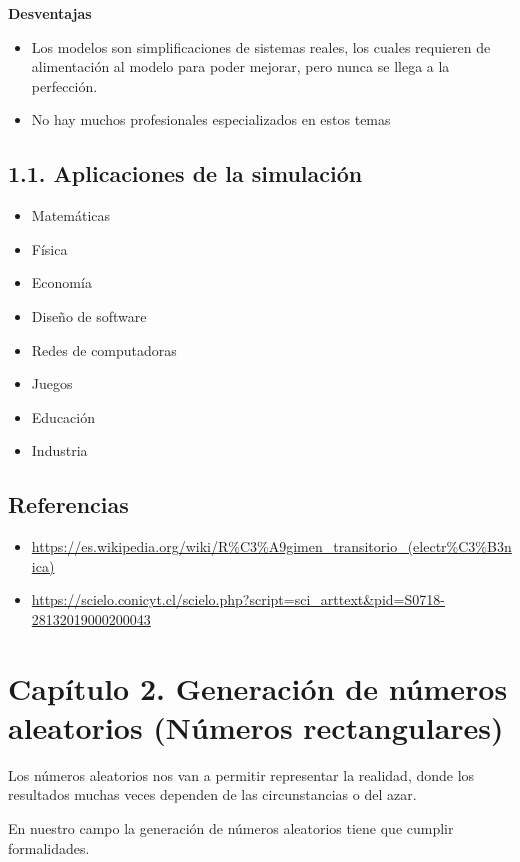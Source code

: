 \documentclass[11pt,letterpaper]{report}
\begin{document}
\textbf{Desventajas}
\begin{itemize}[label=-]
\item Los modelos son simplificaciones de sistemas reales, los cuales requieren de alimentación al modelo para poder mejorar, pero nunca se llega a la perfección.
\item No hay muchos profesionales especializados en estos temas
\end{itemize}

\subsection*{1.1. Aplicaciones de la simulación}

\begin{itemize}
\item Matemáticas
\item Física
\item Economía
\item Diseño de software
\item Redes de computadoras
\item Juegos
\item Educación
\item Industria
\end{itemize}

\subsection*{Referencias}

\begin{itemize}
\item \url{https://es.wikipedia.org/wiki/R%C3%A9gimen_transitorio_(electr%C3%B3nica)}
\item \url{https://scielo.conicyt.cl/scielo.php?script=sci_arttext&pid=S0718-28132019000200043}
\end{itemize}

\section*{Capítulo 2. Generación de números aleatorios (Números rectangulares)}

Los números aleatorios nos van a permitir representar la realidad, donde los resultados muchas veces dependen de las circunstancias o del azar.

En nuestro campo la generación de números aleatorios tiene que cumplir formalidades.
\end{document}
